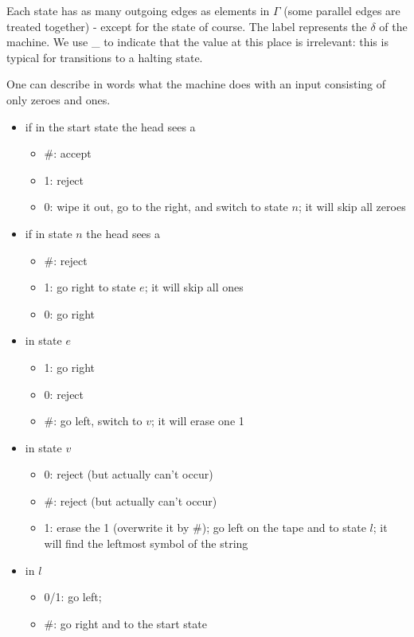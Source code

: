 Each state has as many outgoing edges as elements in $\Gamma$ (some
parallel edges are treated together) - except for the 
state of course. The label represents the $\delta$ of the machine. We
use \_ to indicate that the value at this place is irrelevant: this is
typical for transitions to a halting state.


One can describe in words what the machine does with an input
consisting of only zeroes and ones.

\begin{itemize}
\item if in the start state the head sees a
\begin{itemize}
\item \#: accept
\item 1: reject
\item 0: wipe it out, go to the right, and switch to state $n$; it
  will skip all zeroes
\end{itemize}

\item if in state $n$ the head sees a 
\begin{itemize}
\item \#: reject
\item 1: go right to state $e$; it will skip all ones
\item 0: go right
\end{itemize}


\item in state $e$
\begin{itemize}
\item 1: go right
\item 0: reject
\item \#: go left, switch to $v$; it will erase one 1
\end{itemize}

\item in state $v$
\begin{itemize}
\item 0: reject (but actually can't occur)
\item \#: reject (but actually can't occur)
\item 1: erase the 1 (overwrite it by \#); go left on the tape and to
  state $l$; it will find the leftmost symbol of the string
\end{itemize}

\item in $l$
\begin{itemize}
\item 0/1: go left;
\item \#: go right and to the start state
\end{itemize}

\end{itemize}

